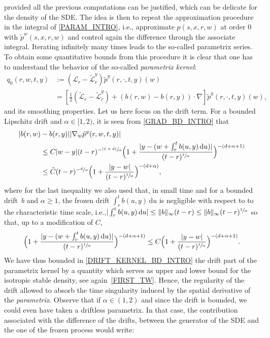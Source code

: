 \documentclass[11pt]{article}
\newcommand{\ie}{i.e.,\xspace}
\numberwithin{equation}{section}\providecommand{\asymp}{\mathrel{\sim}}
\newcommand{\psfrac}[2]{\sfrac{(#1)}{#2}}
\theoremstyle{plain}
\theoremstyle{definition}
\newcommand\cL{{\mathcal L}}
\newcommand\1{{\mathbf{1}}}
\newcommand\sL{{\mathscr L}}
\newcommand{\dif}{\,\mathrm{d}}
\begin{document}
{provided all the previous computations can be justified, which can be delicate for the density of the SDE. The idea is then to repeat the approximation procedure in the integral of \eqref{PARAM_INTRO}, \ie approximate $p(s,x,r,w)$ at order 0 with $\tilde p^w(s,x,r,w)$ and control again the difference through the associate integral. Iterating infinitely many times leads to the so-called parametrix series. To obtain some quantitative bounds from this procedure it is clear that one has to understand the behavior of the so-called \textit{parametrix kernel}:
\begin{align*}
q_0(r,w,t,y)&:=(\sL_{r}-\tilde \sL^{y}_r)\tilde p^y (r,\cdot,t,y)(w)\\
&=[\tfrac 12(\tilde \cL_r-\tilde \cL^{y}_{r}) +(b(r,w)-b(r, y))\cdot\nabla] \tilde p^y(r,\cdot,t,y)(w),%
\end{align*}
and its smoothing properties. Let us here focus on the drift term. For a bounded Lipschitz drift and $\alpha\in [1,2)$, it is seen from \eqref{GRAD_BD_INTRO} that
\begin{equation}\label{DRIFT_KERNEL_BD_INTRO}
\begin{aligned}
|b(r,w)&-b(r,y)||\nabla_w \tilde p^y(r,w,t,y)|\\
&\le  C |w-y|(t-r)^{-\psfrac{1+d}\alpha}\Bigl(1+\frac{|y-(w+\int_r^t b(u,y)\dif u)|}{(t-r)^{\sfrac 1\alpha}}\Bigr)^{-(d+\alpha+1)}\\
&\le  \tilde C (t-r)^{-\sfrac{d}\alpha}\Bigl(1+\frac{|y-w|}{(t-r)^{\sfrac 1\alpha}}\Bigr)^{-(d+\alpha)},
\end{aligned}
\end{equation}
where for the last inequality we also used that, in small time and for a bounded drift~$b $ and $\alpha\ge 1 $, the frozen drift $\int_r^t b(u,y)\dif u$ is negligible with respect to to the characteristic time scale, \ie $|\int_r^t b(u,y)\dif u|\le \|b\|_\infty(t-r)\le \|b\|_\infty(t-r)^{\sfrac 1\alpha} $ so that, up to a modification of $C$,
\[
\Bigl(1+\frac{|y-(w+\int_r^t b(u,y)\dif u)|}{(t-r)^{\sfrac 1\alpha}}\Bigr)^{-(d+\alpha+1)}\le C \Bigl(1+\frac{|y-w|}{(t-r)^{\sfrac 1\alpha}}\Bigr)^{-(d+\alpha+1)}.
\]
We have thus bounded in \eqref{DRIFT_KERNEL_BD_INTRO} the drift part of the parametrix kernel by a quantity which serves as upper and lower bound for the isotropic stable density, see again~\eqref{FIRST_TW}. Hence, the regularity of the drift allowed to absorb the time singularity induced by the spatial derivative of the \textit{parametrix}. Observe that if $\alpha\in (1,2) $ and since the drift is bounded, we could even have taken a driftless parametrix. In that case, the contribution associated with the difference of the drifts, between the generator of the SDE and the one of the frozen process would write:
}
\end{document}
